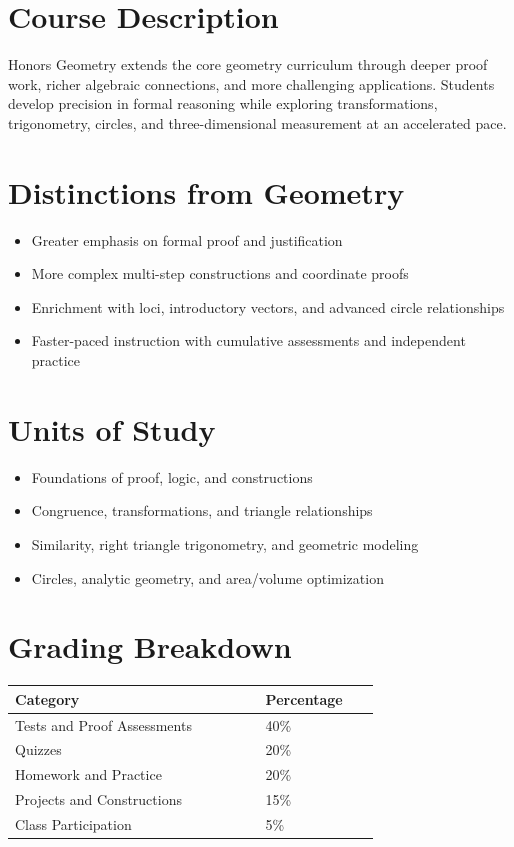 \documentclass[12pt,oneside]{book}
\begin{document}
\section{Course Description}
Honors Geometry extends the core geometry curriculum through deeper proof work, richer algebraic connections,
and more challenging applications. Students develop precision in formal reasoning while exploring
transformations, trigonometry, circles, and three-dimensional measurement at an accelerated pace.

\section{Distinctions from Geometry}
\begin{itemize}[leftmargin=2em]
    \item Greater emphasis on formal proof and justification
    \item More complex multi-step constructions and coordinate proofs
    \item Enrichment with loci, introductory vectors, and advanced circle relationships
    \item Faster-paced instruction with cumulative assessments and independent practice
\end{itemize}

\section{Units of Study}
\begin{itemize}[leftmargin=2em]
    \item Foundations of proof, logic, and constructions
    \item Congruence, transformations, and triangle relationships
    \item Similarity, right triangle trigonometry, and geometric modeling
    \item Circles, analytic geometry, and area/volume optimization
\end{itemize}

\section{Grading Breakdown}
\begin{center}
\begin{tabular}{L{0.55\linewidth}L{0.25\linewidth}}
\toprule
\textbf{Category} & \textbf{Percentage} \\
\midrule
Tests and Proof Assessments & 40\% \\
Quizzes & 20\% \\
Homework and Practice & 20\% \\
Projects and Constructions & 15\% \\
Class Participation & 5\% \\
\bottomrule
\end{tabular}
\end{center}
\end{document}
